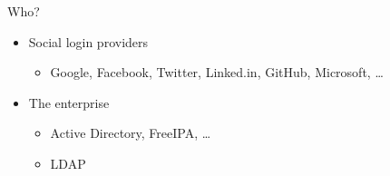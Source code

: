 \documentclass[ignorenonframetext,aspectratio=169]{beamer}
\providecommand{\tightlist}{%
  \setlength{\itemsep}{0pt}\setlength{\parskip}{0pt}}
\begin{document}
\begin{frame}{Who?}
\begin{itemize}

\tightlist
\item Social login providers
\begin{itemize}
\tightlist
\item Google, Facebook, Twitter, Linked.in, GitHub, Microsoft, \ldots
\end{itemize}

\item{The enterprise}
\begin{itemize}
\tightlist
\item Active Directory, FreeIPA, \ldots
\item LDAP
\end{itemize}

\end{itemize}
\end{frame}

\begin{frame}[plain]
\centering
{}
\end{frame}

\begin{frame}[plain]
\centering
{}
\end{frame}
\end{document}
